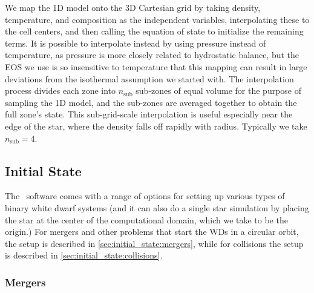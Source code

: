 \documentclass[12pt]{article}
\begin{document}
We map the 1D model onto the 3D Cartesian grid by taking density,
temperature, and composition as the independent variables,
interpolating these to the cell centers, and then calling the equation
of state to initialize the remaining terms. It is possible to interpolate
instead by using pressure instead of temperature, as pressure is more
closely related to hydrostatic balance, but the EOS we use is so
insensitive to temperature that this mapping can result in large
deviations from the isothermal assumption we started with.  The
interpolation process divides each zone into $n_{\text{sub}}$
sub-zones of equal volume for
the purpose of sampling the 1D model, and the sub-zones are averaged
together to obtain the full zone's state. This
sub-grid-scale interpolation is useful especially near the edge of the star,
where the density falls off rapidly with radius. Typically we take
$n_{\text{sub}} = 4$.



\subsection{Initial State}
\label{sec:initial_state}

The \wdmerger\ software comes with a range of options for setting up
various types of binary white dwarf systems (and it can also do a single
star simulation by placing the star at the center of the computational domain,
which we take to be the origin.) For mergers and other problems that start
the WDs in a circular orbit, the setup is described in \autoref{sec:initial_state:mergers},
while for collisions the setup is described in \autoref{sec:initial_state:collisions}.



\subsubsection{Mergers}
\label{sec:initial_state:mergers}
\end{document}
